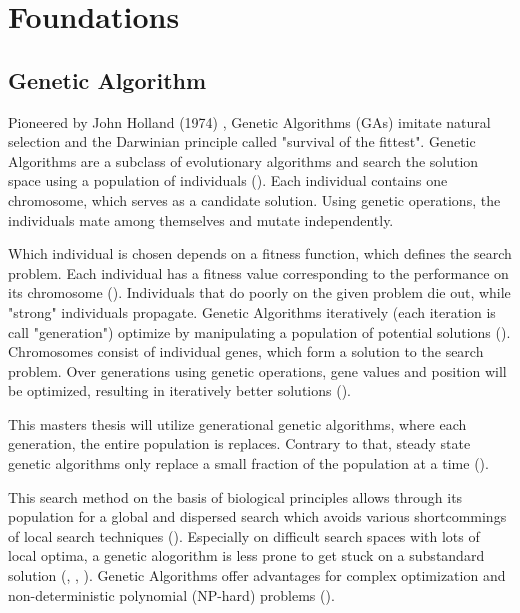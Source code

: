 \chapter{Foundations}
\label{chap:foundation}

\section{Genetic Algorithm}
\label{chap:foundation:genetic_algorithm}

Pioneered by John Holland (1974) , Genetic Algorithms (GAs) imitate natural selection and the Darwinian principle called "survival of the fittest". Genetic Algorithms are a subclass of evolutionary algorithms and search the solution space using a population of individuals (\cite{mills_determining_2015}). Each individual contains one chromosome, which serves as a candidate solution. Using genetic operations, the individuals mate among themselves and mutate independently. 

Which individual is chosen depends on a fitness function, which defines the search problem. Each individual has a fitness value corresponding to the performance on its chromosome (\cite{majumdar_genetic_2015}). Individuals that do poorly on the given problem die out, while "strong" individuals propagate. Genetic Algorithms iteratively (each iteration is call "generation") optimize by manipulating a population of potential solutions (\cite{srinivas_genetic_1994}).
Chromosomes consist of individual genes, which form a solution to the search problem. Over generations using genetic operations, gene values and position will be optimized, resulting in iteratively better solutions (\cite{srinivas_genetic_1994}).

This masters thesis will utilize generational genetic algorithms, where each generation, the entire population is replaces. Contrary to that, steady state genetic algorithms only replace a small fraction of the population at a time (\cite{srinivas_genetic_1994}).

This search method on the basis of biological principles allows through its population for a global and dispersed search which avoids various shortcommings of local search techniques (\cite{grefenstette_optimization_1986}). Especially on difficult search spaces with lots of local optima, a genetic alogorithm is less prone to get stuck on a substandard solution (\cite{katoch_review_2021}, \cite{xia_genetic_2019}, \cite{majumdar_genetic_2015}). Genetic Algorithms offer advantages for complex optimization and non-deterministic polynomial (NP-hard) problems (\cite{hussain_trade-off_2020}).

